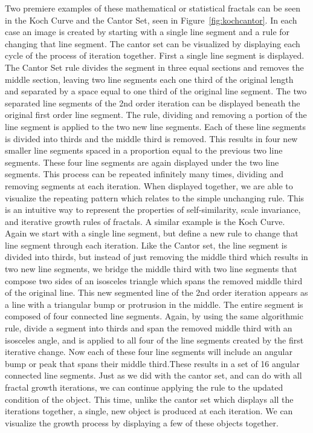 \documentclass[english,jou]{apa6}
\begin{document}
Two premiere examples of these mathematical or statistical fractals can be seen in the Koch Curve and the Cantor Set, seen in Figure~\ref{fig:kochcantor}. In each case an image is created by starting with a single line segment and a rule for changing that line segment. The cantor set can be visualized by displaying each cycle of the process of iteration together. First a single line segment is displayed. The Cantor Set rule divides the segment in three equal sections and removes the middle section, leaving two line segments each one third of the original length and separated by a space equal to one third of the original line segment. The two separated line segments of the 2nd order iteration can be displayed beneath the original first order line segment. The rule, dividing and removing a portion of the line segment is applied to the two new line segments. Each of these line segments is divided into thirds and the middle third is removed. This results in four new smaller line segments spaced in a proportion equal to the previous two line segments. These four line segments are again displayed under the two line segments. This process can be repeated infinitely many times, dividing and removing segments at each iteration. When displayed together, we are able to visualize the repeating pattern which relates to the simple unchanging rule. This is an intuitive way to represent the properties of self-similarity, scale invariance, and iterative growth rules of fractals. A similar example is the Koch Curve. Again we start with a single line segment, but define a new rule to change that line segment through each iteration. Like the Cantor set, the line segment is divided into thirds, but instead of just removing the middle third which results in two new line segments, we bridge the middle third with two line segments that compose two sides of an isosceles triangle which spans the removed middle third of the original line. This new segmented line of the 2nd order iteration appears as a line with a triangular bump or protrusion in the middle. The entire segment is composed of four connected line segments. Again, by using the same algorithmic rule, divide a segment into thirds and span the removed middle third with an isosceles angle, and is applied to all four of the line segments created by the first iterative change. Now each of these four line segments will include an angular bump or peak that spans their middle third.These results in a set of 16 angular connected line segments. Just as we did with the cantor set, and can do with all fractal growth iterations, we can continue applying the rule to the updated condition of the object. This time, unlike the cantor set which displays all the iterations together, a single, new object is produced at each iteration. We can visualize the growth process by displaying a few of these objects together.
\end{document}
